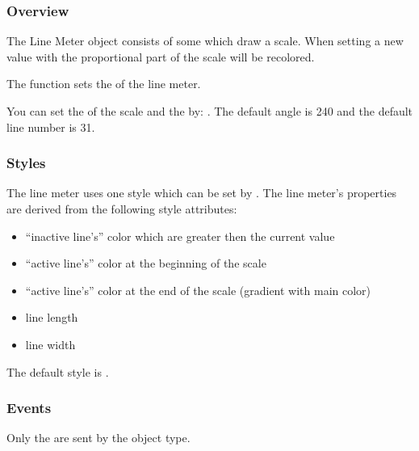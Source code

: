 \documentclass[letterpaper,10pt,english]{sphinxmanual}
\begin{document}
\subsubsection{Overview}
\label{\detokenize{object-types/lmeter:overview}}
The Line Meter object consists of some  which draw a scale. When setting a new value with  the proportional part of the scale will be recolored.

The  function sets the  of the line meter.

You can set the  of the scale and the  by: . The default angle is 240 and the default line number is 31.


\subsubsection{Styles}
\label{\detokenize{object-types/lmeter:styles}}
The line meter uses one style which can be set by . The line meter’s properties are derived from the following style attributes:
\begin{itemize}
\item {} 
 “inactive line’s” color which are greater then the current value

\item {} 
 “active line’s” color at the beginning of the scale

\item {} 
 “active line’s” color at the end of the scale (gradient with main color)

\item {} 
 line length

\item {} 
 line width

\end{itemize}

The default style is .


\subsubsection{Events}
\label{\detokenize{object-types/lmeter:events}}
Only the  are sent by the object type.
\end{document}
